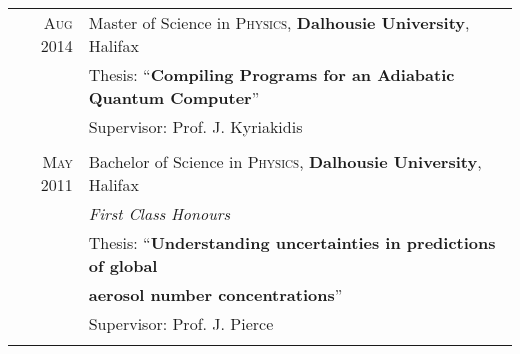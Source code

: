 \documentclass[a4paper,11pt]{article} %
\begin{document}
\begin{tabular}{rl}	

\textsc{Aug} 2014 & Master of Science in \textsc{Physics}, \textbf{Dalhousie University}, Halifax \\
& Thesis: ``\textbf{Compiling Programs for an Adiabatic Quantum Computer}'' \\
& \small Supervisor: Prof. J. Kyriakidis \\
& \\

\textsc{May} 2011 & Bachelor of Science in \textsc{Physics}, \textbf{Dalhousie University}, Halifax \\
& \emph{First Class Honours}  \\
& Thesis: ``\textbf{Understanding uncertainties in predictions of global} \\
& \textbf{aerosol number concentrations}''\\
& \small Supervisor: Prof. J. Pierce \\
& \\







\end{tabular}
\end{document}
